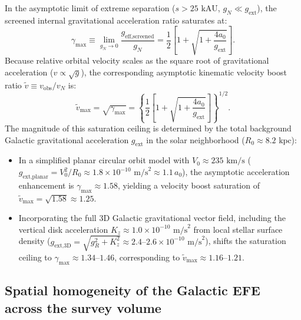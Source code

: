 \documentclass[aps,prd,reprint,superscriptaddress,nofootinbib,floatfix,amsmath,amssymb]{revtex4-2}
\begin{document}
In the asymptotic limit of extreme separation ($s > 25\text{ kAU}$, $g_N \ll g_{\text{ext}}$), the screened internal gravitational acceleration ratio saturates at:
\begin{equation}
\gamma_{\text{max}} \equiv \lim_{g_N \to 0} \frac{g_{\text{eff,screened}}}{g_N} = \frac{1}{2} \left[ 1 + \sqrt{1 + \frac{4 a_0}{g_{\text{ext}}}} \right].
\label{eq:gamma_sat}
\end{equation}
Because relative orbital velocity scales as the square root of gravitational acceleration ($v \propto \sqrt{g}$), the corresponding asymptotic kinematic velocity boost ratio $\tilde{v} \equiv v_{\text{obs}} / v_N$ is:
\begin{equation}
\tilde{v}_{\text{max}} = \sqrt{\gamma_{\text{max}}} = \left\{ \frac{1}{2} \left[ 1 + \sqrt{1 + \frac{4 a_0}{g_{\text{ext}}}} \right] \right\}^{1/2}.
\label{eq:v_sat}
\end{equation}
The magnitude of this saturation ceiling is determined by the total background Galactic gravitational acceleration $g_{\text{ext}}$ in the solar neighborhood ($R_0 \approx 8.2\text{ kpc}$):
\begin{itemize}
\item In a simplified planar circular orbit model with $V_0 \approx 235\text{ km/s}$ ($g_{\text{ext,planar}} = V_0^2 / R_0 \approx 1.8 \times 10^{-10}\text{ m/s}^2 \approx 1.1 \, a_0$), the asymptotic acceleration enhancement is $\gamma_{\text{max}} \approx 1.58$, yielding a velocity boost saturation of $\tilde{v}_{\text{max}} = \sqrt{1.58} \approx 1.25$.
\item Incorporating the full 3D Galactic gravitational vector field, including the vertical disk acceleration $K_z \approx 1.0 \times 10^{-10}\text{ m/s}^2$ from local stellar surface density ($g_{\text{ext,3D}} = \sqrt{g_R^2 + K_z^2} \approx 2.4\text{--}2.6 \times 10^{-10}\text{ m/s}^2$), shifts the saturation ceiling to $\gamma_{\text{max}} \approx 1.34\text{--}1.46$, corresponding to $\tilde{v}_{\text{max}} \approx 1.16\text{--}1.21$.
\end{itemize}

\subsection{Spatial homogeneity of the Galactic EFE across the survey volume}
\label{subsec:spatial_efe}
\end{document}
